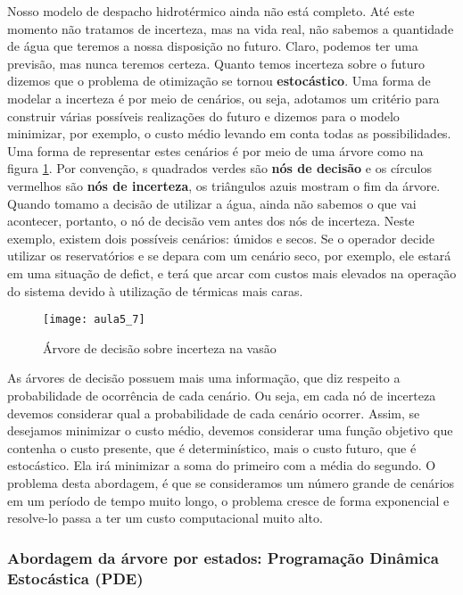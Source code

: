 Nosso modelo de despacho hidrotérmico ainda não está completo. Até este momento não tratamos de incerteza, mas na vida real, não sabemos a quantidade de água que teremos a nossa disposição no futuro. Claro, podemos ter uma previsão, mas nunca teremos certeza. Quanto temos incerteza sobre o futuro dizemos que o problema de otimização se tornou \textbf{estocástico}. Uma forma de modelar a incerteza é por meio de cenários, ou seja, adotamos um critério para construir várias possíveis realizações do futuro e dizemos para o modelo minimizar, por exemplo, o custo médio levando em conta todas as possibilidades. Uma forma de representar estes cenários é por meio de uma árvore como na figura \ref{fig:tree1}. Por convenção, s quadrados verdes são \textbf{nós de decisão} e os círculos vermelhos são \textbf{nós de incerteza}, os triângulos azuis mostram o fim da árvore. Quando tomamo a decisão de utilizar a água, ainda não sabemos o que vai acontecer, portanto, o nó de decisão vem antes dos nós de incerteza. Neste exemplo, existem dois possíveis cenários: úmidos e secos. Se o operador decide utilizar os reservatórios e se depara com um cenário seco, por exemplo, ele estará em uma situação de defict, e terá que arcar com custos mais elevados na operação do sistema devido à utilização de térmicas mais caras. 



\begin{figure}[H]
\begin{centering}
\texttt{[image: aula5\_7]}\protect\caption{\label{fig:tree1} Árvore de decisão sobre incerteza na vasão} 
\end{centering}
\end{figure}

As árvores de decisão possuem mais uma informação, que diz respeito a probabilidade de ocorrência de cada cenário. Ou seja, em cada nó de incerteza devemos considerar qual a probabilidade de cada cenário ocorrer. Assim, se desejamos minimizar o custo médio, devemos considerar uma função objetivo que contenha o custo presente, que é determinístico, mais o custo futuro, que é estocástico. Ela irá minimizar a soma do primeiro com a média do segundo. O problema desta abordagem, é que se consideramos um número grande de cenários em um período de tempo muito longo, o problema cresce de forma exponencial e resolve-lo passa a ter um custo computacional muito alto. 

\subsubsection{Abordagem da árvore por estados: Programação Dinâmica Estocástica (PDE)}

